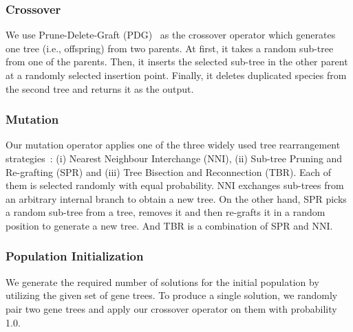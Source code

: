 \subsubsection{Crossover}\label{subsec:crossver}
We use Prune-Delete-Graft (PDG)~\cite{villalobos2018memetic} as the crossover operator which generates one tree (i.e., offspring) from two parents. At first, it takes a random sub-tree from one of the parents. Then, it inserts the selected sub-tree in the other parent at a
randomly selected insertion point. Finally, it deletes duplicated species from the second tree and returns it as the output.

\subsubsection{Mutation} \label{subsec:mutation}
Our mutation operator applies one of the three widely used tree rearrangement strategies~\cite{felsenstein2004inferring}: (i) Nearest Neighbour
Interchange (NNI), (ii) Sub-tree Pruning and Re-grafting (SPR) and (iii) Tree Bisection and Reconnection (TBR). Each of them is selected randomly with equal probability. NNI exchanges sub-trees from an arbitrary internal branch to obtain a new tree. On the other hand, SPR picks a random sub-tree from a tree, removes it and then re-grafts it in a random position to generate a new tree. And TBR is a combination of SPR and NNI.

\subsubsection{Population Initialization}\label{subsec:init}
We generate the required number of solutions for the initial population by utilizing the given set of gene trees. To produce a single solution, we randomly pair two gene trees and apply our crossover operator on them with probability 1.0. 

